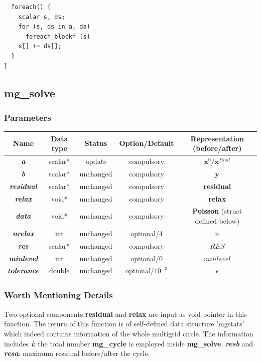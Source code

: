 \documentclass[a4paper]{article}
\newcommand{\func}[1]{\textbf{\textcolor{function}{#1}}}
\newcommand{\para}[1]{\textbf{\emph{\textcolor{para}{#1}}}}
\begin{document}
\begin{multicols}{2}
  \columnbreak
  \begin{verbatim}
  foreach() {
    scalar s, ds;
    for (s, ds in a, da)
      foreach_blockf (s)
	s[] += ds[];
  }
}
  \end{verbatim}
\end{multicols}

\subsection{\func{mg\_solve}}
\subsubsection{Parameters}
\begin{center}
  \begin{tabular}{|c|c|c|c|c|}
    \hline
    Name & Data type & Status & Option/Default & Representation (before/after)\\[0.5ex]
    \hline\hline
    \rowcolor{output}\para{a} & scalar* & update & compulsory & $ \mathbf{x}^{0}/ \mathbf{x}^{final}$\\
    \hline
    \para{b} & scalar* & unchanged & compulsory & $ \mathbf{y} $\\
    \hline
    \para{residual} & scalar* & unchanged & compulsory & \func{residual}\\
    \hline
    \para{relax} & void* & unchanged & compulsory &  \func{relax}\\
    \hline
    \para{data} & void* & unchanged & compulsory &  \func{Poisson} (struct defined below)\\
    \hline
    \para{nrelax} & int & unchanged & optional/4 & $n$ \\
    \hline
    \para{res} & scalar* & unchanged & compulsory & $RES$ \\
    \hline
    \para{minlevel} & int & unchanged & optional/0 & $minlevel$ \\
    \hline
    \para{tolerance} & double & unchanged & optional/$10^{-3}$ & $\epsilon$ \\
    \hline
  \end{tabular}
\end{center}
\subsubsection{Worth Mentioning Details}
Two optional components \func{residual} and \func{relax} are input as void pointer in this function. The return of this function is of self-defined data structure 'mgstats' which indeed contains information of the whole multigrid circle. The information includes \para{i}: the total number \func{mg\_cycle} is employed inside \func{mg\_solve}, \para{resb} and \para{resa}: maximum residual before/after the cycle.
\end{document}
